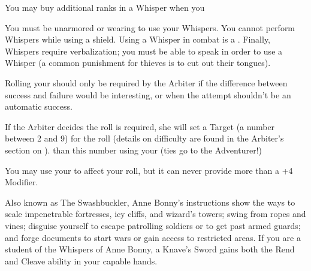 {    You may buy additional ranks in a Whisper when you 

    You must be unarmored or wearing  to use your Whispers.  You cannot perform Whispers while using a shield.   Using a Whisper in combat is a .  Finally, Whispers require verbalization; you must be able to speak in order to use a Whisper (a common punishment for thieves is to cut out their tongues).

    Rolling your \KNAVE should only be required by the Arbiter if the difference between success and failure would be interesting, or when the attempt shouldn't be an automatic success.

    If the Arbiter decides the roll is required, she will set a Target (a number between 2 and 9) for the roll (details on difficulty are found in the Arbiter's section on ).  \RB than this number using your \KNAVE (ties go to the Adventurer!)

    You may use your \LUCK to affect your \KNAVE roll, but it can never provide more than a +4 Modifier.






    Also known as The Swashbuckler, Anne Bonny's instructions show the ways to scale impenetrable fortresses, icy cliffs, and wizard's towers; swing from ropes and vines; disguise yourself to escape patrolling soldiers or to get past armed guards; and forge documents to start wars or gain access to restricted areas. If you are a student of the Whispers of Anne Bonny, a Knave's Sword gains both the Rend and Cleave ability in your capable hands.

}
